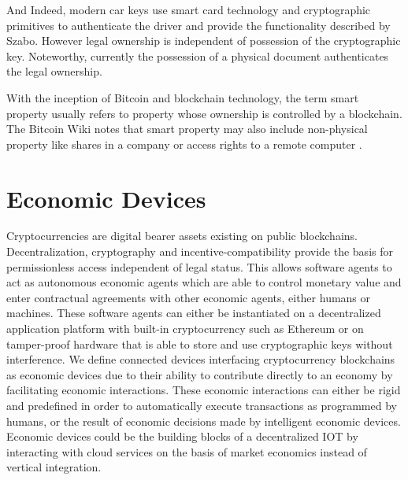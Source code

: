 And Indeed, modern car keys use smart card technology and cryptographic primitives to authenticate the driver and provide the functionality described by Szabo. However legal ownership is independent of possession of the cryptographic key. Noteworthy, currently the possession of a physical document authenticates the legal ownership. 

With the inception of Bitcoin and blockchain technology, the term smart property usually refers to property whose ownership is controlled by a blockchain.
The Bitcoin Wiki notes that smart property may also include non-physical property like shares in a company or access rights to a remote computer \parencite{smartproperty2011}. 

\section{Economic Devices}

Cryptocurrencies are digital bearer assets existing on public blockchains. Decentralization, cryptography and incentive-compatibility provide the basis for permissionless access independent of legal status. This allows software agents to act as autonomous economic agents which are able to control monetary value and enter contractual agreements with other economic agents, either humans or machines. These software agents can either be instantiated on a decentralized application platform with built-in cryptocurrency such as Ethereum or on tamper-proof hardware that is able to store and use cryptographic keys without interference. We define connected devices interfacing cryptocurrency blockchains as economic devices due to their ability to contribute directly to an economy by facilitating economic interactions. These economic interactions can either be rigid and predefined in order to automatically execute transactions as programmed by humans, or the result of economic decisions made by intelligent economic devices. Economic devices could be the building blocks of a decentralized \ac{IOT} by interacting with cloud services on the basis of market economics instead of vertical integration.


